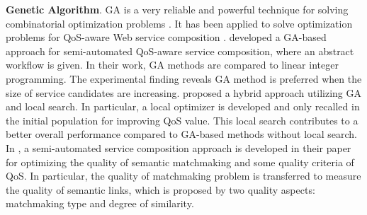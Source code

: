 \textbf{Genetic Algorithm}. 
GA is a very reliable and powerful technique for solving combinatorial optimization problems \cite{srinivas1994genetic}. It has been applied to solve optimization problems for QoS-aware Web service composition \cite{wang2012survey}. \cite{canfora2005approach} developed a GA-based approach for semi-automated QoS-aware service composition, where an abstract workflow is given. In their work, GA methods are compared to linear integer programming. The experimental finding reveals GA method is preferred when the size of service candidates are increasing.  \cite{tang2010hybrid} proposed a hybrid approach utilizing GA and local search. In particular, a local optimizer is developed and only recalled in the initial population for improving QoS value. This local search contributes to a better overall performance compared to GA-based methods without local search. In \cite{lecue2009optimizing},  a semi-automated service composition approach is developed in their paper for optimizing the quality of semantic matchmaking and some quality criteria of QoS. In particular, the quality of matchmaking problem is transferred to measure the quality of semantic links, which is proposed by two quality aspects: matchmaking type and degree of similarity.

